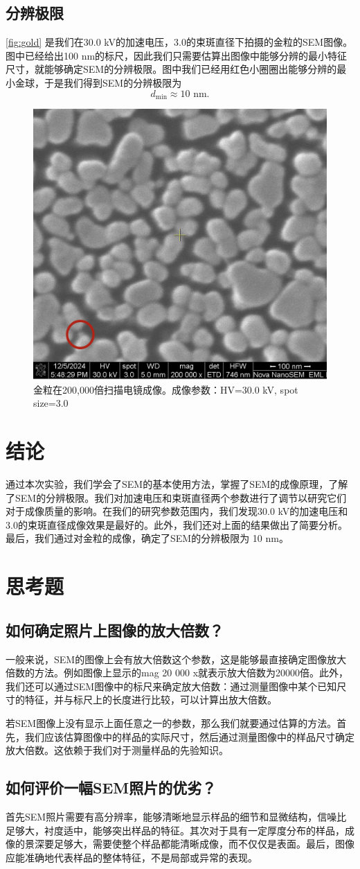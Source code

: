 \documentclass[font=default]{mpltx}
\begin{document}
\subsection{分辨极限}
\autoref{fig:gold} 是我们在30.0 kV的加速电压，3.0的束斑直径下拍摄的金粒的SEM图像。图中已经给出100 nm的标尺，因此我们只需要估算出图像中能够分辨的最小特征尺寸，就能够确定SEM的分辨极限。图中我们已经用红色小圈圈出能够分辨的最小金球，于是我们得到SEM的分辨极限为
\begin{equation}
  d_{\min}\approx 10\text{ nm}.
\end{equation}
\begin{figure}
  \includegraphics[height=0.3\textwidth]{fig/sem_photos/30 kV-3.0_150000x SE_fenbian_002.png}
  \caption{金粒在200,000倍扫描电镜成像。成像参数：HV=30.0 kV, spot size=3.0}
  \label{fig:gold}
\end{figure}
\section{结论}
通过本次实验，我们学会了SEM的基本使用方法，掌握了SEM的成像原理，了解了SEM的分辨极限。我们对加速电压和束斑直径两个参数进行了调节以研究它们对于成像质量的影响。在我们的研究参数范围内，我们发现30.0 kV的加速电压和3.0的束斑直径成像效果是最好的。此外，我们还对上面的结果做出了简要分析。最后，我们通过对金粒的成像，确定了SEM的分辨极限为 10 nm。

\appendix

\section{思考题}
\subsection{如何确定照片上图像的放大倍数？}
一般来说，SEM的图像上会有放大倍数这个参数，这是能够最直接确定图像放大倍数的方法。例如图像上显示的mag 20 000 x就表示放大倍数为20000倍。此外，我们还可以通过SEM图像中的标尺来确定放大倍数：通过测量图像中某个已知尺寸的特征，并与标尺上的长度进行比较，可以计算出放大倍数。

若SEM图像上没有显示上面任意之一的参数，那么我们就要通过估算的方法。首先，我们应该估算图像中的样品的实际尺寸，然后通过测量图像中的样品尺寸确定放大倍数。这依赖于我们对于测量样品的先验知识。
\subsection{如何评价一幅SEM照片的优劣？}
首先SEM照片需要有高分辨率，能够清晰地显示样品的细节和显微结构，信噪比足够大，衬度适中，能够突出样品的特征。其次对于具有一定厚度分布的样品，成像的景深要足够大，需要使整个样品都能清晰成像，而不仅仅是表面。最后，图像应能准确地代表样品的整体特征，不是局部或异常的表现。
\end{document}
